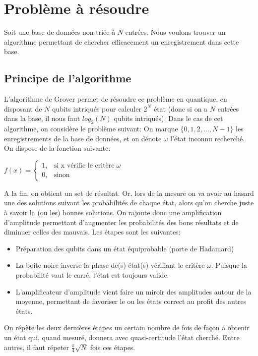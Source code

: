 \documentclass[a4paper]{article}
\begin{document}
\maketitle

\section{Problème à résoudre}
Soit une base de données non triée à $N$ entrées. Nous voulons trouver un algorithme permettant de chercher efficacement un enregistrement dans cette base.

\subsection{Principe de l'algorithme}
L'algorithme de Grover permet de résoudre ce problème en quantique, en disposant de $N$ qubits intriqués pour calculer $2^N$ état 
(donc si on a $N$ entrées dans la base, il nous faut $log_2(N)$ qubits intriqués). Dans le cas de cet algorithme, on considère le problème suivant:
\medbreak
On marque $\{0, 1, 2, ..., N-1\}$ les enregistrements de la base de données, et on dénote $\omega$ l'état inconnu recherché. On dispose de la fonction suivante:

$f(x) = 
 \begin{cases}
   1, & \text{si x vérifie le critère} \; \omega \\
   0, & \text{sinon}
 \end{cases}
$

A la fin, on obtient un set de résultat. Or, lors de la mesure on va avoir au hasard une des solutions suivant les probabilités de chaque état, alors qu'on cherche
juste à savoir la (ou les) bonnes solutions. On rajoute donc une amplification d'amplitude permettant d'augmenter les probabilités des bons résultats et de diminuer
celles des mauvais.
\medbreak
Les étapes sont les suivantes:
\begin{itemize}
  \item Préparation des qubits dans un état équiprobable (porte de Hadamard)
  \item La boite noire inverse la phase de(s) état(s) vérifiant le critère $\omega$. Puisque la probabilité vaut le carré, l'état est toujours valide.
  \item L'amplificateur d'amplitude vient faire un miroir des amplitudes autour de la moyenne, permettant de favoriser le ou les états correct au profit des autres états.
\end{itemize}

On répète les deux dernières étapes un certain nombre de fois de façon a obtenir un état qui, quand mesuré, donnera avec quasi-certitude l'état cherché. Entre autres, il
faut répeter $\frac{\pi}{4}\sqrt{N}$ fois ces étapes.
\end{document}
